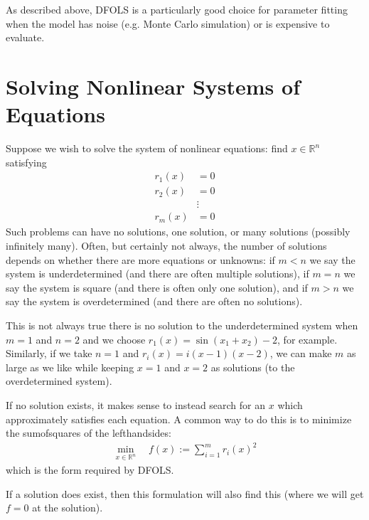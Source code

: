 \documentclass[letterpaper,10pt,english]{sphinxmanual}
\begin{document}
As described above, DFO\sphinxhyphen{}LS is a particularly good choice for parameter fitting when the model has noise (e.g. Monte Carlo simulation) or is expensive to evaluate.


\section{Solving Nonlinear Systems of Equations}
\label{\detokenize{info:solving-nonlinear-systems-of-equations}}
Suppose we wish to solve the system of nonlinear equations: find \(x\in\mathbb{R}^n\) satisfying
\begin{equation*}
\begin{split}r_1(x) &= 0 \\
r_2(x) &= 0 \\
&\vdots \\
r_m(x) &= 0\end{split}
\end{equation*}
Such problems can have no solutions, one solution, or many solutions (possibly infinitely many). Often, but certainly not always, the number of solutions depends on whether there are more equations or unknowns: if \(m<n\) we say the system is underdetermined (and there are often multiple solutions), if \(m=n\) we say the system is square (and there is often only one solution), and if \(m>n\) we say the system is overdetermined (and there are often no solutions).

This is not always true \textendash{} there is no solution to the underdetermined system when \(m=1\) and \(n=2\) and we choose \(r_1(x)=\sin(x_1+x_2)-2\), for example.
Similarly, if we take \(n=1\) and \(r_i(x)=i (x-1)(x-2)\), we can make \(m\) as large as we like while keeping \(x=1\) and \(x=2\) as solutions (to the overdetermined system).

If no solution exists, it makes sense to instead search for an \(x\) which approximately satisfies each equation. A common way to do this is to minimize the sum\sphinxhyphen{}of\sphinxhyphen{}squares of the left\sphinxhyphen{}hand\sphinxhyphen{}sides:
\begin{equation*}
\begin{split}\min_{x\in\mathbb{R}^n}  \quad  f(x) := \sum_{i=1}^{m}r_i(x)^2\end{split}
\end{equation*}
which is the form required by DFO\sphinxhyphen{}LS.

If a solution does exist, then this formulation will also find this (where we will get \(f=0\) at the solution).
\end{document}
